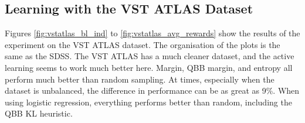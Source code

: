 \subsection{Learning with the VST ATLAS Dataset}

Figures \ref{fig:vstatlas_bl_ind} to \ref{fig:vstatlas_avg_rewards} show the results of the experiment on the VST ATLAS dataset.
The organisation of the plots is the same as the SDSS.
The VST ATLAS has a much cleaner dataset, and the active learning seems to work
much better here. Margin, QBB margin, and entropy all perform much better than random sampling.
At times, especially when the dataset is unbalanced, the difference in performance can
be as great as 9\%. When using logistic regression, everything performs better
than random, including the QBB KL heuristic.

